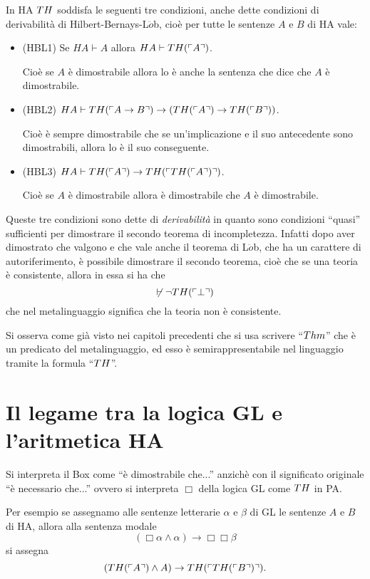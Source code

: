 In HA $TH$ soddisfa le seguenti tre condizioni, anche dette condizioni di derivabilità di
Hilbert-Bernays-L$\ddot{o}$b, cio\`e per tutte le sentenze $A$ e $B$ di HA vale:
\begin{itemize}
\item (HBL1) Se $HA \vdash A$ allora  $HA \vdash TH(\ulcorner{A}\urcorner)$. 

Cio\`e se $A$ \`e dimostrabile allora lo \`e anche la sentenza che dice che $A$ \`e dimostrabile.
\item  (HBL2) $HA \vdash TH(\ulcorner{A\rightarrow B}\urcorner)\rightarrow (TH(\ulcorner{A}\urcorner)\rightarrow TH(\ulcorner{B}\urcorner))$.

Cio\`e \`e sempre dimostrabile che se un'implicazione
e il suo antecedente sono dimostrabili, allora lo \`e il suo conseguente.
\item  (HBL3) $HA \vdash TH(\ulcorner{A}\urcorner)\rightarrow TH(\ulcorner{TH(\ulcorner{A}\urcorner)}\urcorner)$.

Cio\`e se $A$ \`e dimostrabile allora \`e dimostrabile che $A$ \`e dimostrabile.
\end{itemize}

Queste tre condizioni sono dette di \textit{derivabilità}
in quanto sono condizioni "`quasi"' sufficienti per dimostrare il secondo teorema di incompletezza.
Infatti dopo aver dimostrato che valgono e che vale anche il teorema di L$\ddot{o}$b, che ha un carattere di autoriferimento,
\`e possibile dimostrare il secondo teorema, cio\`e che se una teoria \`e consistente, allora in essa si ha che 
$$\not\vdash \neg TH(\ulcorner{\bot}\urcorner)$$
che nel metalinguaggio significa che la teoria non \`e consistente.




\begin{oss}
Si osserva come già visto nei capitoli precedenti che si usa scrivere "`$Thm$"' che \`e un predicato del metalinguaggio,
ed esso \`e semirappresentabile nel linguaggio tramite la formula "`$TH$"'.
\end{oss}

\section{Il legame tra la logica GL e l'aritmetica HA}

Si interpreta il Box come "`\`e dimostrabile che..."' anzich\`e con il significato originale "`\`e necessario che..."' ovvero si interpreta $\Box$ della logica GL come $TH$ in PA.

\begin{esempio}
Per esempio se assegnamo alle sentenze letterarie $\alpha$ e $\beta$ 
di GL le sentenze $A$ e $B$ di HA, allora alla sentenza modale
$$(\Box\alpha \wedge \alpha)\rightarrow \Box\Box \beta$$
si assegna
$$ (TH(\ulcorner{A}\urcorner) \wedge A)\rightarrow TH(\ulcorner{TH(\ulcorner{B}\urcorner)}\urcorner).$$
\end{esempio}

